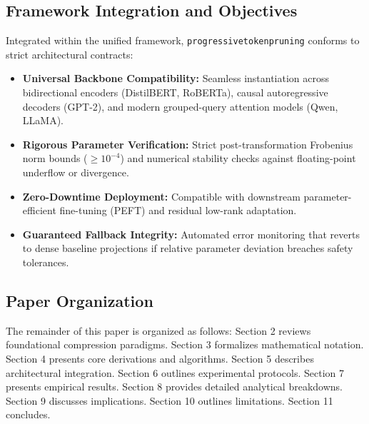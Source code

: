 \subsection{Framework Integration and Objectives}
Integrated within the unified framework, \texttt{progressivetokenpruning} conforms to strict architectural contracts:
\begin{itemize}
\item \textbf{Universal Backbone Compatibility:} Seamless instantiation across bidirectional encoders (DistilBERT, RoBERTa), causal autoregressive decoders (GPT-2), and modern grouped-query attention models (Qwen, LLaMA).
\item \textbf{Rigorous Parameter Verification:} Strict post-transformation Frobenius norm bounds ($\ge 10^{-4}$) and numerical stability checks against floating-point underflow or divergence.
\item \textbf{Zero-Downtime Deployment:} Compatible with downstream parameter-efficient fine-tuning (PEFT) and residual low-rank adaptation.
\item \textbf{Guaranteed Fallback Integrity:} Automated error monitoring that reverts to dense baseline projections if relative parameter deviation breaches safety tolerances.
\end{itemize}

\subsection{Paper Organization}
The remainder of this paper is organized as follows: Section 2 reviews foundational compression paradigms. Section 3 formalizes mathematical notation. Section 4 presents core derivations and algorithms. Section 5 describes architectural integration. Section 6 outlines experimental protocols. Section 7 presents empirical results. Section 8 provides detailed analytical breakdowns. Section 9 discusses implications. Section 10 outlines limitations. Section 11 concludes.

